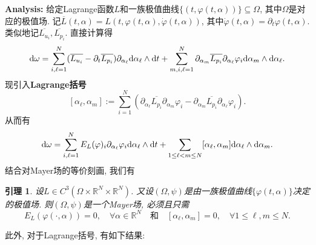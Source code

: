 \documentclass[12pt,a4paper]{article}
\newtheorem{lemma}[theorem]{引理}
\begin{document}
\textbf{Analysis:} 给定Lagrange函数$L$和一族极值曲线$\{(t, \varphi(t, \alpha))\} \subseteq \Omega$, 其中$\Omega$是对应的极值场.
记$\overline{L}(t, \alpha) = L(t, \varphi(t, \alpha), \dot\varphi(t, \alpha))$, 其中$\dot\varphi(t, \alpha) = \partial_t\varphi(t, \alpha)$.
类似地记$\overline{L_{u_i}}, \overline{L_{p_i}}$. 直接计算得 
\begin{equation*}
    {\rm d}\omega = \sum_{i, \ell = 1}^N(\overline{L_{u_i}} - \partial_t\overline{L_{p_i}})\partial_{\alpha_\ell} {\rm d}\alpha_{\ell} \wedge {\rm d}t + \sum_{m, i, \ell = 1}^N\partial_{\alpha_m}\overline{L_{p_i}}\partial_{\alpha_{\ell}}\varphi_i {\rm d}\alpha_m \wedge {\rm d}\alpha_{\ell}.
\end{equation*}
现引入\textbf{Lagrange括号}
\begin{equation*}
    \boxed{[\alpha_\ell, \alpha_m] := \sum_{i = 1}^N(\partial_{\alpha_\ell}\overline{L_{p_i}}\partial_{\alpha_m}\varphi_i - \partial_{\alpha_m}\overline{L_{p_i}}\partial_{\alpha_\ell}\varphi_i).}
\end{equation*}
从而有
\begin{equation*}
    {\rm d}\omega = \sum_{i, \ell = 1}^NE_L(\varphi)_i\partial_{\alpha_\ell}\varphi_i {\rm d}\alpha_{\ell} \wedge {\rm d}t + \sum_{1 \leq \ell < m \leq N}[\alpha_\ell, \alpha_m] {\rm d}\alpha_{\ell} \wedge {\rm d}\alpha_m.
\end{equation*}
结合对Mayer场的等价刻画, 我们有

\begin{lemma}
    设$L \in C^3(\Omega \times \mathbb{R}^N \times \mathbb{R}^N)$. 又设$(\Omega, \psi)$是由一族极值曲线$\{\varphi(t, \alpha)\}$决定的极值场.
    则$(\Omega, \psi)$是一个Mayer场, 必须且只需 
    \begin{equation*}
        E_L(\varphi(\cdot, \alpha)) = 0, \quad \forall \alpha \in \mathbb{R}^N \quad \text{和} \quad [\alpha_{\ell}, \alpha_m] = 0, \quad \forall 1 \leq \ell, m \leq N.
    \end{equation*}
\end{lemma}

此外, 对于Lagrange括号, 有如下结果:
\end{document}
